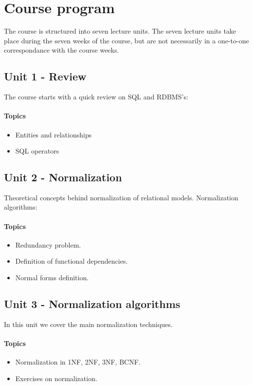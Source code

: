 \section{Course program}
	The course is structured into seven lecture units. The seven lecture units take place during the seven weeks of the course, but are not necessarily in a one-to-one correspondance with the course weeks.

	\subsection{Unit 1 - Review}
		The course starts with a quick review on SQL and RDBMS's:

		\paragraph*{Topics}
			\begin{itemize}
				\item Entities and relationships
				\item SQL operators
			\end{itemize}
			
	\subsection{Unit 2 - Normalization}
		Theoretical concepts behind normalization of relational models. Normalization algorithms:

		\paragraph*{Topics}
			\begin{itemize}
				\item Redundancy problem.
				\item Definition of functional dependencies.
				\item Normal forms definition.
			\end{itemize}

	\subsection{Unit 3 - Normalization algorithms}
		In this unit we cover the main normalization techniques.
		\paragraph*{Topics}
		\begin{itemize}
			\item Normalization in 1NF, 2NF, 3NF, BCNF.
			\item Exercises on normalization.
		\end{itemize}		


